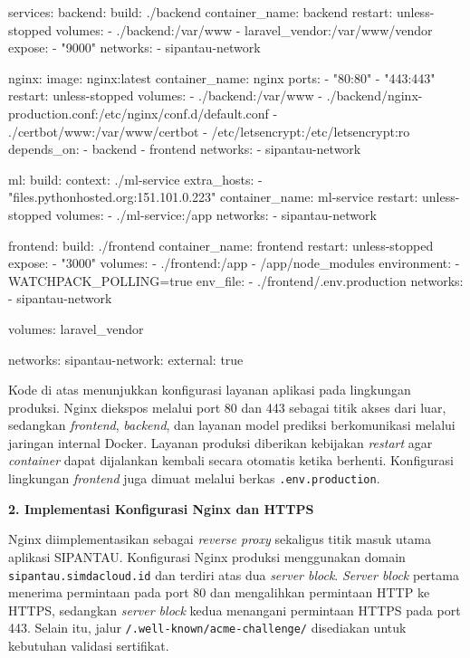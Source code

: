 \begin{code}
\begin{ignasicblock}
services:
  backend:
    build: ./backend
    container_name: backend
    restart: unless-stopped
    volumes:
      - ./backend:/var/www
      - laravel_vendor:/var/www/vendor
    expose:
      - "9000"
    networks:
      - sipantau-network

  nginx:
    image: nginx:latest
    container_name: nginx
    ports:
      - "80:80"
      - "443:443"
    restart: unless-stopped
    volumes:
      - ./backend:/var/www
      - ./backend/nginx-production.conf:/etc/nginx/conf.d/default.conf
      - ./certbot/www:/var/www/certbot
      - /etc/letsencrypt:/etc/letsencrypt:ro
    depends_on:
      - backend
      - frontend
    networks:
      - sipantau-network

  ml:
    build:
      context: ./ml-service
      extra_hosts:
        - "files.pythonhosted.org:151.101.0.223"
    container_name: ml-service
    restart: unless-stopped
    volumes:
      - ./ml-service:/app
    networks:
      - sipantau-network

  frontend:
    build: ./frontend
    container_name: frontend
    restart: unless-stopped
    expose:
      - "3000"
    volumes:
      - ./frontend:/app
      - /app/node_modules
    environment:
      - WATCHPACK_POLLING=true
    env_file:
      - ./frontend/.env.production
    networks:
      - sipantau-network

volumes:
  laravel_vendor

networks:
  sipantau-network:
    external: true
\end{ignasicblock}
\end{code}

Kode di atas menunjukkan konfigurasi layanan aplikasi pada lingkungan produksi. Nginx diekspos melalui port 80 dan 443 sebagai titik akses dari luar, sedangkan \textit{frontend}, \textit{backend}, dan layanan model prediksi berkomunikasi melalui jaringan internal Docker. Layanan produksi diberikan kebijakan \textit{restart} agar \textit{container} dapat dijalankan kembali secara otomatis ketika berhenti. Konfigurasi lingkungan \textit{frontend} juga dimuat melalui berkas \texttt{.env.production}.

\vspace{0.5em}
\noindent\textbf{2. Implementasi Konfigurasi Nginx dan HTTPS}
\vspace{0.5em}

Nginx diimplementasikan sebagai \textit{reverse proxy} sekaligus titik masuk utama aplikasi SIPANTAU. Konfigurasi Nginx produksi menggunakan domain \texttt{sipantau.\allowbreak simdacloud.id} dan terdiri atas dua \textit{server block}. \textit{Server block} pertama menerima permintaan pada port 80 dan mengalihkan permintaan HTTP ke HTTPS, sedangkan \textit{server block} kedua menangani permintaan HTTPS pada port 443. Selain itu, jalur \texttt{/.well-known/acme-\allowbreak challenge/} disediakan untuk kebutuhan validasi sertifikat.

